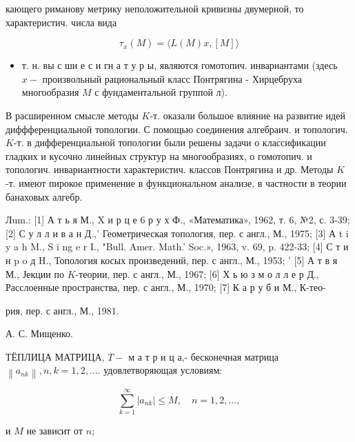 \documentclass[10pt]{article}
\begin{document}
кающего риманову метрику неположительной кривизны двумерной, то характеристич. числа вида



\[

\tau_{x}(M)=\langle L(M) x,[M]\rangle

\]



\begin{itemize}

  \item т. н. вы с ши е с и гн а т у р ы, являются гомотопич. инвариантами (здесь $x-$ произвольный рациональный класс Понтрягина - Хирцебруха многообразия $M$ с фундаментальной группой л).

\end{itemize}



В расширенном смысле методы $K$-т. оказали большое влияние на развитие идей диффференциальной топологии. С помощью соединения алгебраич. и топологич. $K$-т. в дифференциальной топологии были решены задачи о классификации гладких и кусочно линейных структур на многообразиях, о гомотопич. и топологич. инвариантности характеристич. классов Понтрягина и др. Методы $K$-т. имеют пирокое применение в функциональном анализе, в частности в теории банаховых алгебр.



Лum.: [1] А т ь я М., X и р ц е 6 р у х Ф., «Математика», 1962, т. 6, №2, с. 3-39; [2] С у л л и в а н Д.,' Геометрическая топология, пер. с англ., М., 1975; [3] А t i y a h M., S i ng e r I., "Bull. Amer. Math.' Soc.», 1963, v. 69, p. 422-33; [4] С т и н p o д H., Топология косых произведений, пер. с англ., М., 1953; ' [5] А т в я М., Јекции по $K$-теории, пер. с англ., М., 1967; [6] Х ь ю з м о л л е р Д., Расслоенные пространства, пер. с англ., М., 1970; [7] К а р у б и М., К-тео-

рия, пер. с англ., М., 1981.

А. С. Мищенко.



ТЁПЛИЦА МАТРИЦА, $T-$ м а т р и ц а,- бесконечная матрица $\left\|a_{n k}\right\|, n, k=1,2, \ldots$. удовлетворяющая условиям:



\[

\sum_{k=1}^{\infty}\left|a_{n k}\right| \leqslant M, \quad n=1,2, \ldots,

\]



и $M$ не зависит от $n$;
\end{document}
